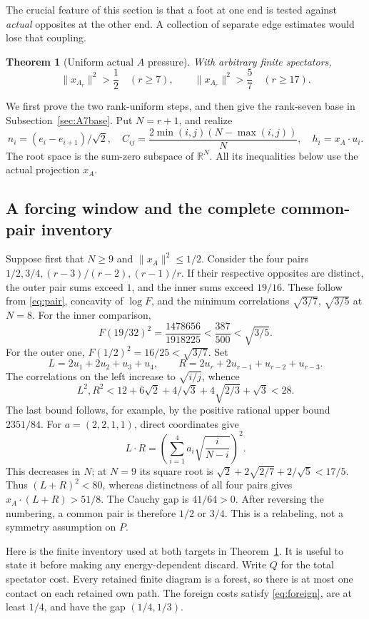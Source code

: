 \documentclass[11pt]{article}
\newtheorem{theorem}{Theorem}[section]
\theoremstyle{remark}
\newcommand{\RR}{\mathbb R}
\begin{document}
The crucial feature of this section is that a foot at one end is
tested against \emph{actual} opposites at the other end. A collection
of separate edge estimates would lose that coupling.

\begin{theorem}[Uniform actual \(A\) pressure]\label{thm:A}
With arbitrary finite spectators,
\[
 \|x_{A_r}\|^2>\frac12\quad(r\ge7),\qquad
 \|x_{A_r}\|^2>\frac57\quad(r\ge17).
\]
\end{theorem}

We first prove the two rank-uniform steps, and then give the
rank-seven base in Subsection~\ref{sec:A7base}. Put \(N=r+1\), and realize
\[
 n_i=(e_i-e_{i+1})/\sqrt2,\quad
 C_{ij}=\frac{2\min(i,j)(N-\max(i,j))}{N},\quad
 h_i=x_A\cdot u_i .
\]
The root space is the sum-zero subspace of \(\RR^N\). All its
inequalities below use the actual projection \(x_A\).

\subsection{A forcing window and the complete common-pair inventory}

Suppose first that \(N\ge9\) and \(\|x_A\|^2\le1/2\). Consider the
four pairs \(1/2,3/4,(r-3)/(r-2),(r-1)/r\).
If their respective opposites are distinct, the outer pair sums
exceed \(1\), and the inner sums exceed \(19/16\). These follow
from \eqref{eq:pair}, concavity of \(\log F\), and the minimum
correlations \(\sqrt{3/7}\), \(\sqrt{3/5}\) at \(N=8\).
For the inner comparison,
\[
 F(19/32)^2=\frac{1478656}{1918225}
 <\frac{387}{500}<\sqrt{3/5}.
\]
For the outer one, \(F(1/2)^2=16/25<\sqrt{3/7}\).
Set
\[
 L=2u_1+2u_2+u_3+u_4,\qquad
 R=2u_r+2u_{r-1}+u_{r-2}+u_{r-3}.
\]
The correlations on the left increase to \(\sqrt{i/j}\), whence
\[
 L^2,R^2<
 12+6\sqrt2+4/\sqrt3+4\sqrt{2/3}+\sqrt3<28.
\]
The last bound follows, for example, by the positive rational
upper bound \(2351/84\). For \(a=(2,2,1,1)\), direct coordinates give
\[
 L\cdot R=\left(\sum_{i=1}^4a_i\sqrt{\frac{i}{N-i}}\right)^2.
\]
This decreases in \(N\); at \(N=9\) its square root is
\(\sqrt2+2\sqrt{2/7}+2/\sqrt5<17/5\).
Thus \((L+R)^2<80\), whereas distinctness of all four pairs gives
\(x_A\cdot(L+R)>51/8\). The Cauchy gap is \(41/64>0\).
After reversing the numbering, a common pair is therefore \(1/2\)
or \(3/4\). This is a relabeling, not a symmetry assumption on \(P\).

Here is the finite inventory used at both targets in
Theorem~\ref{thm:A}. It is useful to state it before making any
energy-dependent discard. Write \(Q\) for the total spectator cost.
Every retained finite diagram is a forest, so there is at most one
contact on each retained own path. The foreign costs satisfy
\eqref{eq:foreign}, are at least \(1/4\), and have the gap
\((1/4,1/3)\).
\end{document}
